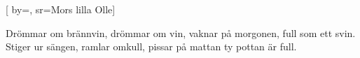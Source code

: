 [
    by={},
    sr={Mors lilla Olle}]

\beginverse
Drömmar om brännvin,
drömmar om vin,
vaknar på morgonen, full som ett svin.
Stiger ur sängen, ramlar omkull,
pissar på mattan ty pottan är full.
\endverse
\endsong
